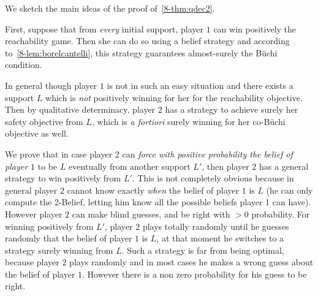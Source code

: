 
\smallskip
We sketch the main ideas of the proof of~\cref{8-thm:qdec2}.


First, suppose that from \emph{every} initial support, player $1$ can
win positively the  reachability game.
{Then she can do so using a belief strategy and according to~\cref{8-lem:borelcantelli},}
this strategy guarantees
almost-surely the B{\"u}chi condition.

In general though player $1$ is not in such an easy situation and
there exists a support $L$ which is \emph{not} positively winning
for her for the reachability objective.
Then by qualitative determinacy, player $2$ has a strategy to achieve surely her safety objective
from $L$, which is \emph{a fortiori}
surely winning for her co-B{\"u}chi objective as well.


We prove that in case player $2$ can \emph{force with positive
  probability the belief of player $1$} to be $L$ eventually from another
support $L'$, then player $2$
{ has a general strategy to win positively from $L'$}.
This is not completely obvious because in general player $2$ cannot
know exactly \emph{when} the belief of player $1$ is $L$ (he can only
compute the 2-Belief, letting him know all the possible beliefs player
1 can have).  However player $2$ can make blind guesses,
and be right with $>0$ probability.
For winning positively from $L'$, player $2$ plays
totally randomly until he guesses randomly that the belief of player
$1$ is $L$, at that moment he switches to a strategy surely winning
from $L$.  Such a strategy is far from being optimal, because player
$2$ plays randomly and in most cases he makes a wrong guess about the
belief of player $1$.  However 
there is a non zero probability for his guess to be right.

